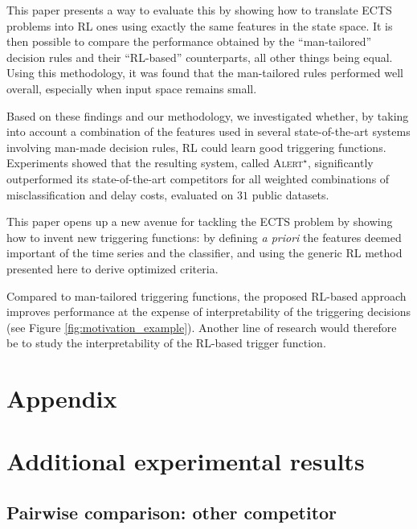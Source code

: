 \documentclass[sigconf, nonacm, table]{acmart}
\begin{document}
This paper presents a way to evaluate this by showing how to translate ECTS problems into RL ones using exactly the same features in the state space. It is then possible to compare the performance obtained by the ``man-tailored'' decision rules and their ``RL-based'' counterparts, all other things being equal. Using this methodology, it was found that the man-tailored rules performed well overall, especially when input space remains small. 


Based on these findings and our methodology, we investigated whether, by taking into account a combination of the features used in several state-of-the-art systems involving man-made decision rules, RL could learn good triggering functions. 
Experiments showed that the resulting system, called \textsc{Alert}$^\star$, significantly outperformed its state-of-the-art competitors for all weighted combinations of misclassification and delay costs, evaluated on $31$ public datasets. 
 

This paper opens up a new avenue for tackling the ECTS problem by showing how to invent new triggering functions: by defining \textit{a priori} the features deemed important of the time series and the classifier, and using the generic RL method presented here to derive optimized criteria.

Compared to man-tailored triggering functions, the proposed RL-based approach improves performance at the expense of interpretability of the triggering decisions (see Figure \ref{fig:motivation_example}). Another line of research would therefore be to study the interpretability of the RL-based trigger function. 











\appendix


\section*{Appendix}




\section{Additional experimental results}\label{add_expe}

\subsection{Pairwise comparison: other competitor}\label{app_pairwise}
\end{document}
